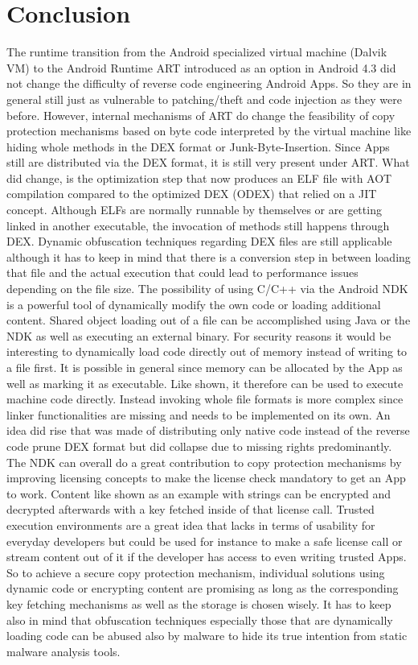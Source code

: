 \chapter{Conclusion}\label{chapter:conclusion}
The runtime transition from the Android specialized virtual machine (Dalvik VM)
to the Android Runtime ART introduced as an option in Android 4.3 did not change the difficulty of reverse code engineering Android Apps. So they are in general still just as vulnerable to patching/theft and code injection as they were before.
However, internal mechanisms of ART do change the feasibility of copy protection
mechanisms based on byte code interpreted by the virtual machine like hiding
whole methods in the DEX format or Junk-Byte-Insertion. 
Since Apps still are distributed via the DEX
format, it is still very present under ART. What did change, is the optimization
step that now produces an ELF file with AOT compilation compared to the optimized
DEX (ODEX) that relied on a JIT concept. Although ELFs are normally runnable by 
themselves or are getting linked in another executable, the invocation of methods still happens through DEX. 
Dynamic obfuscation techniques regarding DEX files are still applicable although
it has to keep in mind that there is a conversion step in between loading that 
file and the actual execution that could lead to performance issues depending 
on the file size. The possibility of using C/C++ via the Android NDK is a 
powerful tool of dynamically modify the own code or loading additional
content. Shared object loading out of a file can be accomplished using Java or 
the NDK as well as executing an external binary. For security reasons it
would be interesting to dynamically load code directly out of memory instead
of writing to a file first. It is possible in general since memory can be allocated by the App as well as marking it as executable. Like shown, it
therefore can be used to execute machine code directly. Instead invoking 
whole file formats is more complex since linker functionalities are missing
and needs to be implemented on its own. An idea did rise that was made of 
distributing only native code instead of the reverse code prune DEX format
but did collapse due to missing rights predominantly. 
The NDK can overall do a great contribution to copy protection mechanisms
by improving licensing concepts to make the license check mandatory to get 
an App to work. Content like shown as an example with strings can be 
encrypted and decrypted afterwards with a key fetched inside of that
license call. Trusted execution environments are a great idea that lacks 
in terms of usability for everyday developers but could be used for instance
to make a safe license call or stream content out of it if the developer 
has access to even writing trusted Apps. 
So to achieve a secure copy protection mechanism, individual solutions
using dynamic code or encrypting content are promising as long as the 
corresponding key fetching mechanisms as well as the storage is chosen wisely.
It has to keep also in mind that obfuscation techniques especially those that 
are dynamically loading code can be abused also by malware to hide its true
intention from static malware analysis tools.

